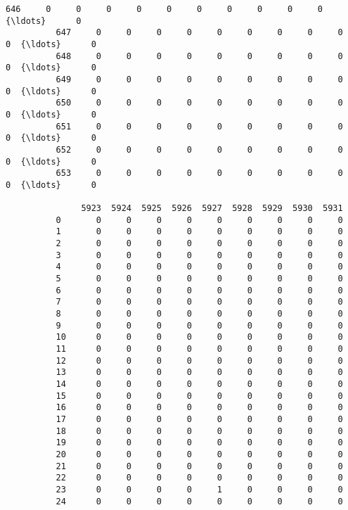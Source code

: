 \documentclass[11pt]{article}
\begin{document}
\begin{Verbatim}[commandchars=\\\{\}]
          646     0     0     0     0     0     0     0     0     0     0  {\ldots}      0   
          647     0     0     0     0     0     0     0     0     0     0  {\ldots}      0   
          648     0     0     0     0     0     0     0     0     0     0  {\ldots}      0   
          649     0     0     0     0     0     0     0     0     0     0  {\ldots}      0   
          650     0     0     0     0     0     0     0     0     0     0  {\ldots}      0   
          651     0     0     0     0     0     0     0     0     0     0  {\ldots}      0   
          652     0     0     0     0     0     0     0     0     0     0  {\ldots}      0   
          653     0     0     0     0     0     0     0     0     0     0  {\ldots}      0   
          
               5923  5924  5925  5926  5927  5928  5929  5930  5931  
          0       0     0     0     0     0     0     0     0     0  
          1       0     0     0     0     0     0     0     0     0  
          2       0     0     0     0     0     0     0     0     0  
          3       0     0     0     0     0     0     0     0     0  
          4       0     0     0     0     0     0     0     0     0  
          5       0     0     0     0     0     0     0     0     0  
          6       0     0     0     0     0     0     0     0     0  
          7       0     0     0     0     0     0     0     0     0  
          8       0     0     0     0     0     0     0     0     0  
          9       0     0     0     0     0     0     0     0     0  
          10      0     0     0     0     0     0     0     0     0  
          11      0     0     0     0     0     0     0     0     0  
          12      0     0     0     0     0     0     0     0     0  
          13      0     0     0     0     0     0     0     0     0  
          14      0     0     0     0     0     0     0     0     0  
          15      0     0     0     0     0     0     0     0     0  
          16      0     0     0     0     0     0     0     0     0  
          17      0     0     0     0     0     0     0     0     0  
          18      0     0     0     0     0     0     0     0     0  
          19      0     0     0     0     0     0     0     0     0  
          20      0     0     0     0     0     0     0     0     0  
          21      0     0     0     0     0     0     0     0     0  
          22      0     0     0     0     0     0     0     0     0  
          23      0     0     0     0     1     0     0     0     0  
          24      0     0     0     0     0     0     0     0     0  

\end{Verbatim}
\end{document}

